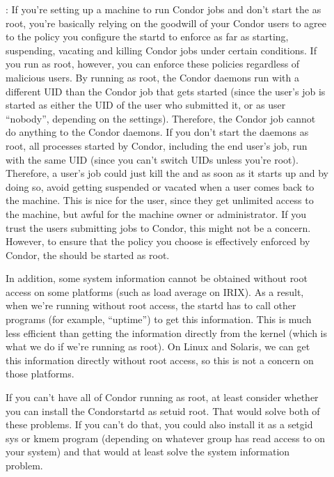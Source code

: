 \begin{description}

\item[] : If you're setting up a machine to run Condor
   jobs and don't start the  as root, you're basically
   relying on the goodwill of your Condor users to agree to the policy
   you configure the startd to enforce as far as starting, suspending,
   vacating and killing Condor jobs under certain conditions.  If you
   run as root, however, you can enforce these policies regardless of
   malicious users.  By running as root, the Condor daemons run with a
   different UID than the Condor job that gets started (since the
   user's job is started as either the UID of the user who submitted
   it, or as user ``nobody'', depending on the 
   settings).  Therefore, the Condor job cannot do anything to the
   Condor daemons.  If you don't start the daemons as root, all
   processes started by Condor, including the end user's job, run with
   the same UID (since you can't switch UIDs unless you're root).
   Therefore, a user's job could just kill the  and
    as soon as it starts up and by doing so, avoid
   getting suspended or vacated when a user comes back to the machine.
   This is nice for the user, since they get unlimited access to the
   machine, but awful for the machine owner or administrator.  If you
   trust the users submitting jobs to Condor, this might not be a
   concern.  However, to ensure that the policy you choose is
   effectively enforced by Condor, the  should be
   started as root.

   In addition, some system information cannot be obtained without
   root access on some platforms (such as load average on IRIX).  As a
   result, when we're running without root access, the startd has to
   call other programs (for example, ``uptime'') to get this
   information.  This is much less efficient than getting the
   information directly from the kernel (which is what we do if we're
   running as root).  On Linux and Solaris, we can get this
   information directly without root access, so this is not a concern
   on those platforms.

   If you can't have all of Condor running as root, at least consider
   whether you can install the Condor{startd} as setuid root.  That
   would solve both of these problems.  If you can't do that, you
   could also install it as a setgid sys or kmem program (depending on
   whatever group has read access to  on your system)
   and that would at least solve the system information problem.


\end{description}
